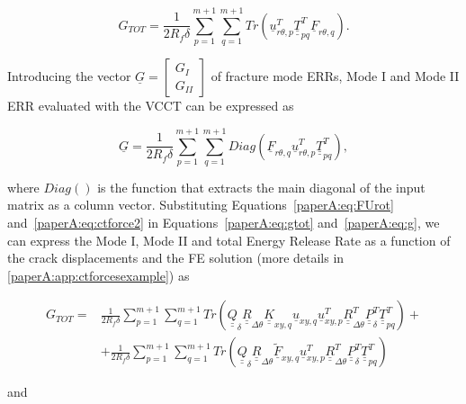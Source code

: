 \begin{equation}\label{paperA:eq:gtot}
G_{TOT} = \frac{1}{2R_{f}\delta}\sum_{p=1}^{m+1}\sum_{q=1}^{m+1}Tr\left(\underline{u}_{r\theta,p}^{T}\underline{\underline{T}}_{pq}^{T}\underline{F}_{r\theta,q}\right).
\end{equation}

Introducing the vector $\underline{G}=\begin{bmatrix}
G_{I} \\
G_{II}
\end{bmatrix}$ of fracture mode ERRs, Mode I and Mode II ERR evaluated with the VCCT can be expressed as

\begin{equation}\label{paperA:eq:g}
\underline{G} =\frac{1}{2R_{f}\delta}\sum_{p=1}^{m+1}\sum_{q=1}^{m+1}Diag\left(\underline{F}_{r\theta,q}\underline{u}_{r\theta,p}^{T}\underline{\underline{T}}_{pq}^{T}\right),
\end{equation}

where $Diag\left(\right)$ is the function that extracts the main diagonal of the input matrix as a column vector. Substituting Equations~\ref{paperA:eq:FUrot} and~\ref{paperA:eq:ctforce2} in Equations~\ref{paperA:eq:gtot} and~\ref{paperA:eq:g}, we can express the Mode I, Mode II and total Energy Release Rate as a function of the crack displacements and the FE solution (more details in \ref{paperA:app:ctforcesexample}) as

\begin{equation}\label{paperA:eq:gtotlong}
\begin{split}
G_{TOT} =&\frac{1}{2R_{f}\delta}\sum_{p=1}^{m+1}\sum_{q=1}^{m+1}Tr\left(\underline{\underline{Q}}_{\delta}\underline{\underline{R}}_{\Delta\theta}\underline{\underline{K}}_{xy,q}\underline{u}_{xy,q}\underline{u}_{xy,p}^{T}\underline{\underline{R}}_{\Delta\theta}^{T}\underline{\underline{P}}_{\delta}^{T}\underline{\underline{T}}_{pq}^{T}\right)+\\&+\frac{1}{2R_{f}\delta}\sum_{p=1}^{m+1}\sum_{q=1}^{m+1}Tr\left(\underline{\underline{Q}}_{\delta}\underline{\underline{R}}_{\Delta\theta}\underline{\widetilde{F}}_{xy,q}\underline{u}_{xy,p}^{T}\underline{\underline{R}}_{\Delta\theta}^{T}\underline{\underline{P}}_{\delta}^{T}\underline{\underline{T}}_{pq}^{T}\right)
\end{split}
\end{equation}

and

